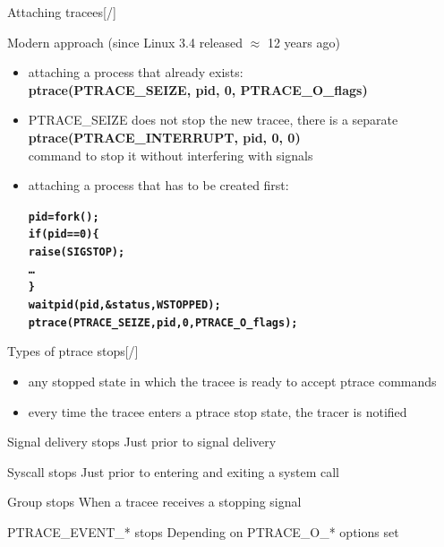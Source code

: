 \documentclass[unicode,aspectratio=169,xcolor={table,dvipsnames,usenames}]{beamer}
\begin{document}
\begin{frame}[fragile]{\Large Attaching tracees\hfill [\insertframenumber/\inserttotalframenumber]}
\large
\begin{block}{Modern approach (since Linux 3.4 released $\approx$ 12 years ago)}
\begin{itemize}
	\item attaching a process that already exists: \\
		\textbf{ptrace(PTRACE\_SEIZE, pid, 0, PTRACE\_O\_flags)}
	\item PTRACE\_SEIZE does not stop the new tracee, there is a separate \\
		\textbf{ptrace(PTRACE\_INTERRUPT, pid, 0, 0)} \\
		command to stop it without interfering with signals
	\item attaching a process that has to be created first:
	\begin{alltt}\bf
		pid = fork();
		if (pid == 0) \{
		    raise(SIGSTOP);
		    \ldots
		\}
		waitpid(pid, &status, WSTOPPED);
		ptrace(PTRACE_SEIZE, pid, 0, PTRACE_O_flags);
	\end{alltt}
\end{itemize}
\end{block}
\end{frame}

\begin{frame}{\Large Types of ptrace stops\hfill [\insertframenumber/\inserttotalframenumber]}
\begin{itemize}
	\item any stopped state in which the tracee is ready to accept ptrace commands
	\item every time the tracee enters a ptrace stop state, the tracer is notified
\end{itemize}
\Large
\begin{block}{Signal delivery stops}
	Just prior to signal delivery
\end{block}
\begin{block}{Syscall stops}
	Just prior to entering and exiting a system call
\end{block}
\begin{block}{Group stops}
	When a tracee receives a stopping signal
\end{block}
\begin{block}{PTRACE\_EVENT\_* stops}
	Depending on PTRACE\_O\_* options set
\end{block}
\end{frame}
\end{document}
